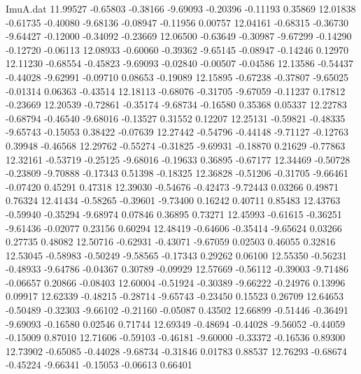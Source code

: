 \begin{filecontents}{ImuA.dat}
  11.99527   -0.65803   -0.38166   -9.69093   -0.20396   -0.11193    0.35869
  12.01838   -0.61735   -0.40080   -9.68136   -0.08947   -0.11956    0.00757
  12.04161   -0.68315   -0.36730   -9.64427   -0.12000   -0.34092   -0.23669
  12.06500   -0.63649   -0.30987   -9.67299   -0.14290   -0.12720   -0.06113
  12.08933   -0.60060   -0.39362   -9.65145   -0.08947   -0.14246    0.12970
  12.11230   -0.68554   -0.45823   -9.69093   -0.02840   -0.00507   -0.04586
  12.13586   -0.54437   -0.44028   -9.62991   -0.09710    0.08653   -0.19089
  12.15895   -0.67238   -0.37807   -9.65025   -0.01314    0.06363   -0.43514
  12.18113   -0.68076   -0.31705   -9.67059   -0.11237    0.17812   -0.23669
  12.20539   -0.72861   -0.35174   -9.68734   -0.16580    0.35368    0.05337
  12.22783   -0.68794   -0.46540   -9.68016   -0.13527    0.31552    0.12207
  12.25131   -0.59821   -0.48335   -9.65743   -0.15053    0.38422   -0.07639
  12.27442   -0.54796   -0.44148   -9.71127   -0.12763    0.39948   -0.46568
  12.29762   -0.55274   -0.31825   -9.69931   -0.18870    0.21629   -0.77863
  12.32161   -0.53719   -0.25125   -9.68016   -0.19633    0.36895   -0.67177
  12.34469   -0.50728   -0.23809   -9.70888   -0.17343    0.51398   -0.18325
  12.36828   -0.51206   -0.31705   -9.66461   -0.07420    0.45291    0.47318
  12.39030   -0.54676   -0.42473   -9.72443    0.03266    0.49871    0.76324
  12.41434   -0.58265   -0.39601   -9.73400    0.16242    0.40711    0.85483
  12.43763   -0.59940   -0.35294   -9.68974    0.07846    0.36895    0.73271
  12.45993   -0.61615   -0.36251   -9.61436   -0.02077    0.23156    0.60294
  12.48419   -0.64606   -0.35414   -9.65624    0.03266    0.27735    0.48082
  12.50716   -0.62931   -0.43071   -9.67059    0.02503    0.46055    0.32816
  12.53045   -0.58983   -0.50249   -9.58565   -0.17343    0.29262    0.06100
  12.55350   -0.56231   -0.48933   -9.64786   -0.04367    0.30789   -0.09929
  12.57669   -0.56112   -0.39003   -9.71486   -0.06657    0.20866   -0.08403
  12.60004   -0.51924   -0.30389   -9.66222   -0.24976    0.13996    0.09917
  12.62339   -0.48215   -0.28714   -9.65743   -0.23450    0.15523    0.26709
  12.64653   -0.50489   -0.32303   -9.66102   -0.21160   -0.05087    0.43502
  12.66899   -0.51446   -0.36491   -9.69093   -0.16580    0.02546    0.71744
  12.69349   -0.48694   -0.44028   -9.56052   -0.44059   -0.15009    0.87010
  12.71606   -0.59103   -0.46181   -9.60000   -0.33372   -0.16536    0.89300
  12.73902   -0.65085   -0.44028   -9.68734   -0.31846    0.01783    0.88537
  12.76293   -0.68674   -0.45224   -9.66341   -0.15053   -0.06613    0.66401

\end{filecontents}

